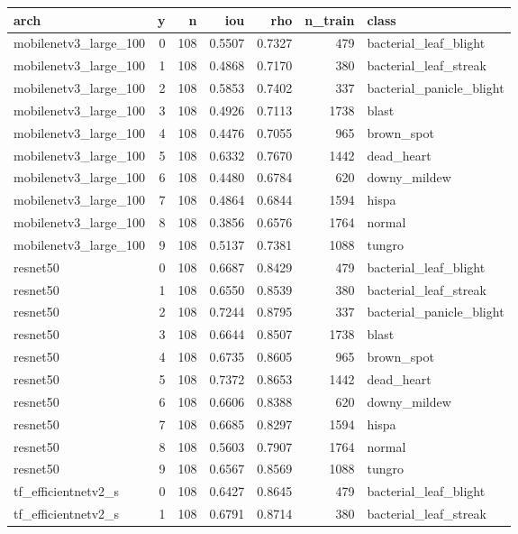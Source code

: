 \begin{tabular}{lrrrrrl}
\toprule
arch & y & n & iou & rho & n\_train & class \\
\midrule
mobilenetv3\_large\_100 & 0 & 108 & 0.5507 & 0.7327 & 479 & bacterial\_leaf\_blight \\
mobilenetv3\_large\_100 & 1 & 108 & 0.4868 & 0.7170 & 380 & bacterial\_leaf\_streak \\
mobilenetv3\_large\_100 & 2 & 108 & 0.5853 & 0.7402 & 337 & bacterial\_panicle\_blight \\
mobilenetv3\_large\_100 & 3 & 108 & 0.4926 & 0.7113 & 1738 & blast \\
mobilenetv3\_large\_100 & 4 & 108 & 0.4476 & 0.7055 & 965 & brown\_spot \\
mobilenetv3\_large\_100 & 5 & 108 & 0.6332 & 0.7670 & 1442 & dead\_heart \\
mobilenetv3\_large\_100 & 6 & 108 & 0.4480 & 0.6784 & 620 & downy\_mildew \\
mobilenetv3\_large\_100 & 7 & 108 & 0.4864 & 0.6844 & 1594 & hispa \\
mobilenetv3\_large\_100 & 8 & 108 & 0.3856 & 0.6576 & 1764 & normal \\
mobilenetv3\_large\_100 & 9 & 108 & 0.5137 & 0.7381 & 1088 & tungro \\
resnet50 & 0 & 108 & 0.6687 & 0.8429 & 479 & bacterial\_leaf\_blight \\
resnet50 & 1 & 108 & 0.6550 & 0.8539 & 380 & bacterial\_leaf\_streak \\
resnet50 & 2 & 108 & 0.7244 & 0.8795 & 337 & bacterial\_panicle\_blight \\
resnet50 & 3 & 108 & 0.6644 & 0.8507 & 1738 & blast \\
resnet50 & 4 & 108 & 0.6735 & 0.8605 & 965 & brown\_spot \\
resnet50 & 5 & 108 & 0.7372 & 0.8653 & 1442 & dead\_heart \\
resnet50 & 6 & 108 & 0.6606 & 0.8388 & 620 & downy\_mildew \\
resnet50 & 7 & 108 & 0.6685 & 0.8297 & 1594 & hispa \\
resnet50 & 8 & 108 & 0.5603 & 0.7907 & 1764 & normal \\
resnet50 & 9 & 108 & 0.6567 & 0.8569 & 1088 & tungro \\
tf\_efficientnetv2\_s & 0 & 108 & 0.6427 & 0.8645 & 479 & bacterial\_leaf\_blight \\
tf\_efficientnetv2\_s & 1 & 108 & 0.6791 & 0.8714 & 380 & bacterial\_leaf\_streak \\

\end{tabular}
